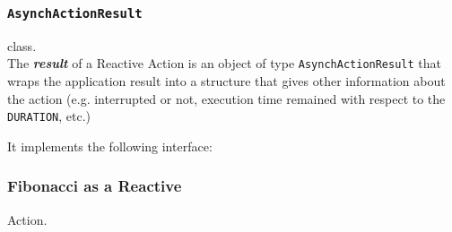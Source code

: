 


\subsubsection{\texttt{AsynchActionResult}} class.\\
The \textit{\textbf{result}} of a Reactive Action is an object of type \texttt{AsynchActionResult} that  wraps the application result into a structure that gives other information about the action (e.g. interrupted or not, execution time remained with respect to the \texttt{DURATION}, etc.)

 


It implements the following interface:
 


\subsubsection{Fibonacci as a Reactive} Action.\\

